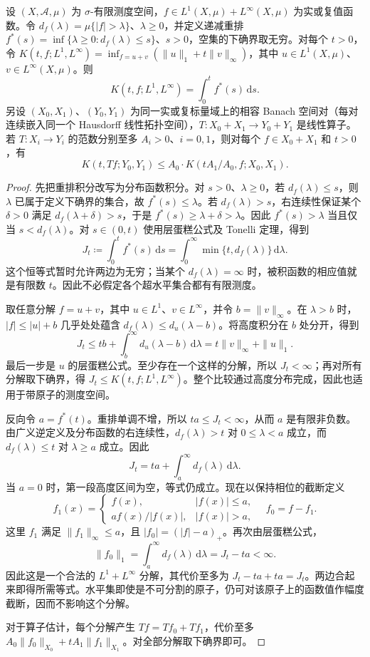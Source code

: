 \begin{proposition}\label{b2:prop:17-k-functional}
设 \((X,\mathcal A,\mu)\) 为 \(\sigma\)-有限测度空间，\(f\in L^1(X,\mu)+L^\infty(X,\mu)\) 为实或复值函数。令 \(d_f(\lambda)=\mu\{|f|>\lambda\}\)、\(\lambda\geq0\)，并定义递减重排 \(f^*(s)=\inf\{\lambda\geq0:d_f(\lambda)\leq s\}\)、\(s>0\)，空集的下确界取无穷。对每个 \(t>0\)，令 \(K(t,f;L^1,L^\infty)=\inf_{f=u+v}(\|u\|_1+t\|v\|_\infty)\)，其中 \(u\in L^1(X,\mu)\)、\(v\in L^\infty(X,\mu)\)。则
\[
 K(t,f;L^1,L^\infty)=\int_0^t f^*(s)\,\mathrm ds.
\]
另设 \((X_0,X_1)\)、\((Y_0,Y_1)\) 为同一实或复标量域上的相容 Banach 空间对（每对连续嵌入同一个 Hausdorff 线性拓扑空间），\(T:X_0+X_1\rightarrow Y_0+Y_1\) 是线性算子。若 \(T:X_i\rightarrow Y_i\) 的范数分别至多 \(A_i>0\)、\(i=0,1\)，则对每个 \(f\in X_0+X_1\) 和 \(t>0\)，有
\[
 K(t,Tf;Y_0,Y_1)\leq A_0\cdot K(tA_1/A_0,f;X_0,X_1).
\]
\end{proposition}
\begin{proof}
先把重排积分改写为分布函数积分。对 \(s>0\)、\(\lambda\geq0\)，若 \(d_f(\lambda)\leq s\)，则 \(\lambda\) 已属于定义下确界的集合，故 \(f^*(s)\leq\lambda\)。若 \(d_f(\lambda)>s\)，右连续性保证某个 \(\delta>0\) 满足 \(d_f(\lambda+\delta)>s\)，于是 \(f^*(s)\geq\lambda+\delta>\lambda\)。因此 \(f^*(s)>\lambda\) 当且仅当 \(s<d_f(\lambda)\)。对 \(s\in(0,t)\) 使用层蛋糕公式及 Tonelli 定理，得到
\[
 J_t\coloneqq\int_0^t f^*(s)\,\mathrm ds
 =\int_0^\infty\min\{t,d_f(\lambda)\}\,\mathrm d\lambda.
\]
这个恒等式暂时允许两边为无穷；当某个 \(d_f(\lambda)=\infty\) 时，被积函数的相应值就是有限数 \(t\)。因此不必假定各个超水平集合都有有限测度。

取任意分解 \(f=u+v\)，其中 \(u\in L^1\)、\(v\in L^\infty\)，并令 \(b=\|v\|_\infty\)。在 \(\lambda>b\) 时，\(|f|\leq|u|+b\) 几乎处处蕴含
\(d_f(\lambda)\leq d_u(\lambda-b)\)。将高度积分在 \(b\) 处分开，得到
\[
 J_t\leq tb+\int_b^\infty d_u(\lambda-b)\,\mathrm d\lambda
 =t\|v\|_\infty+\|u\|_1.
\]
最后一步是 \(u\) 的层蛋糕公式。至少存在一个这样的分解，所以 \(J_t<\infty\)；再对所有分解取下确界，得 \(J_t\leq K(t,f;L^1,L^\infty)\)。整个比较通过高度分布完成，因此也适用于带原子的测度空间。

反向令 \(a=f^*(t)\)。重排单调不增，所以 \(ta\leq J_t<\infty\)，从而 \(a\) 是有限非负数。由广义逆定义及分布函数的右连续性，\(d_f(\lambda)>t\) 对 \(0\leq\lambda<a\) 成立，而 \(d_f(\lambda)\leq t\) 对 \(\lambda\geq a\) 成立。因此
\[
 J_t=ta+\int_a^\infty d_f(\lambda)\,\mathrm d\lambda.
\]
当 \(a=0\) 时，第一段高度区间为空，等式仍成立。现在以保持相位的截断定义
\[
 f_1(x)=
 \begin{cases}f(x),&|f(x)|\leq a,\\a f(x)/|f(x)|,&|f(x)|>a,\end{cases}
 \quad f_0=f-f_1.
\]
这里 \(f_1\) 满足 \(\|f_1\|_\infty\leq a\)，且 \(|f_0|=(|f|-a)_+\)。再次由层蛋糕公式，
\[
 \|f_0\|_1=\int_a^\infty d_f(\lambda)\,\mathrm d\lambda
 =J_t-ta<\infty.
\]
因此这是一个合法的 \(L^1+L^\infty\) 分解，其代价至多为 \(J_t-ta+ta=J_t\)。两边合起来即得所需等式。水平集即使是不可分割的原子，仍可对该原子上的函数值作幅度截断，因而不影响这个分解。

对于算子估计，每个分解产生 \(Tf=Tf_0+Tf_1\)，代价至多 \(A_0\|f_0\|_{X_0}+tA_1\|f_1\|_{X_1}\)。对全部分解取下确界即可。
\end{proof}

